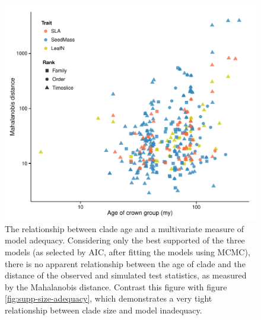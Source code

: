 \documentclass[a4paper,11pt]{article}
\begin{document}
\begin{figure}[p]
  \centering
  \includegraphics[scale=0.8]{figs/ad-age-bayes}
  \caption{The relationship between clade age and a multivariate measure of model adequacy. Considering only the best supported of the three models (as selected by AIC, after fitting the models using MCMC), there is no  apparent relationship between the age of clade and the distance of the observed and simulated test statistics, as measured by the Mahalanobis distance. Contrast this figure with figure \ref{fig:supp-size-adequacy}, which demonstrates a very tight relationship between clade size and model inadequacy.}
  \label{fig:supp-age-bayes}
\end{figure}
\end{document}
